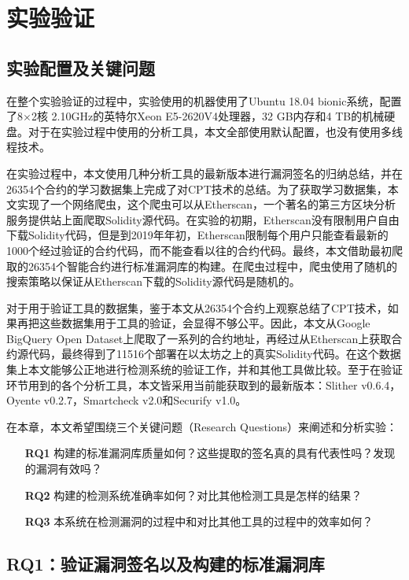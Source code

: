 \chapter{实验验证}

\section{实验配置及关键问题}

在整个实验验证的过程中，实验使用的机器使用了Ubuntu 18.04 bionic系统，配置了8$\times$2核 2.10GHz的英特尔Xeon E5-2620V4处理器，32 GB内存和4 TB的机械硬盘。对于在实验过程中使用的分析工具，本文全部使用默认配置，也没有使用多线程技术。

在实验过程中，本文使用几种分析工具的最新版本进行漏洞签名的归纳总结，并在26354个合约的学习数据集上完成了对CPT技术的总结。为了获取学习数据集，本文实现了一个网络爬虫，这个爬虫可以从Etherscan，一个著名的第三方区块分析服务提供站上面爬取Solidity源代码。在实验的初期，Etherscan没有限制用户自由下载Solidity代码，但是到2019年年初，Etherscan限制每个用户只能查看最新的1000个经过验证的合约代码，而不能查看以往的合约代码。最终，本文借助最初爬取的26354个智能合约进行标准漏洞库的构建。在爬虫过程中，爬虫使用了随机的搜索策略以保证从Etherscan下载的Solidity源代码是随机的。

对于用于验证工具的数据集，鉴于本文从26354个合约上观察总结了CPT技术，如果再把这些数据集用于工具的验证，会显得不够公平。因此，本文从Google BigQuery Open Dataset上爬取了一系列的合约地址，再经过从Etherscan上获取合约源代码，最终得到了11516个部署在以太坊之上的真实Solidity代码。在这个数据集上本文能够公正地进行检测系统的验证工作，并和其他工具做比较。至于在验证环节用到的各个分析工具，本文皆采用当前能获取到的最新版本：Slither v0.6.4，Oyente v0.2.7，Smartcheck v2.0和Securify v1.0。

在本章，本文希望围绕三个关键问题（Research Questions）来阐述和分析实验：
\begin{itemize}
  \item[\textbf{RQ1}] 构建的标准漏洞库质量如何？这些提取的签名真的具有代表性吗？发现的漏洞有效吗？
  \item[\textbf{RQ2}] 构建的检测系统准确率如何？对比其他检测工具是怎样的结果？
  \item[\textbf{RQ3}] 本系统在检测漏洞的过程中和对比其他工具的过程中的效率如何？
\end{itemize}

\section{RQ1：验证漏洞签名以及构建的标准漏洞库}


